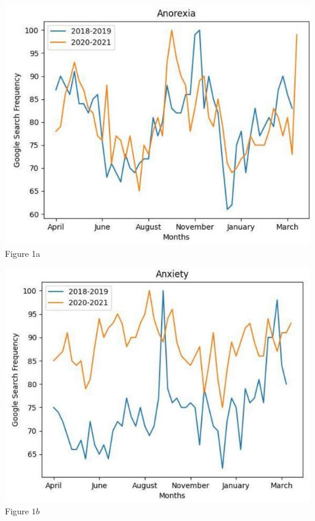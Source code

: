 \documentclass{article}
\begin{document}
\begin{center}
\includegraphics[scale=0.50]{2023_08_04_7b2b5ae1fb9d756e7758g-3}
\\ Figure 1a
\end{center}

\begin{center}
\includegraphics[scale=0.50]{2023_08_04_7b2b5ae1fb9d756e7758g-3(1)}
\\ Figure $1 b$
\end{center}
\end{document}
